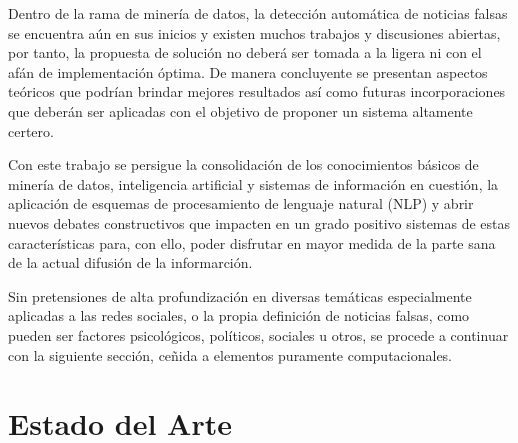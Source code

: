 \documentclass{llncs}
\begin{document}
\begin{multicols}{2}[]
Dentro de la rama de miner\'ia de datos, la detecci\'on autom\'atica de noticias falsas se encuentra a\'un en sus inicios y existen muchos trabajos y discusiones abiertas,
por tanto, la propuesta de soluci\'on no deber\'a ser tomada a la ligera ni con el af\'an de implementaci\'on \'optima. De manera concluyente se presentan aspectos te\'oricos
que podr\'ian brindar mejores resultados as\'i como futuras incorporaciones que deber\'an ser aplicadas con el objetivo de proponer un sistema altamente certero.

Con este trabajo se persigue la consolidaci\'on de los conocimientos b\'asicos de miner\'ia de datos, inteligencia artificial y sistemas de informaci\'on en cuesti\'on, la aplicaci\'on 
de esquemas de procesamiento de lenguaje natural (NLP) y abrir nuevos debates constructivos que impacten en un grado positivo sistemas de estas caracter\'isticas para, 
con ello, poder disfrutar en mayor medida de la parte sana de la actual difusi\'on de la informarci\'on.

Sin pretensiones de alta profundizaci\'on en diversas tem\'aticas especialmente aplicadas a las redes sociales, o la propia definici\'on de noticias falsas, como pueden ser factores
 psicol\'ogicos, pol\'iticos, sociales u otros, se procede a continuar con la siguiente secci\'on, ce\~nida a elementos puramente computacionales.
\section{Estado del Arte}
\end{multicols}



\end{document}
